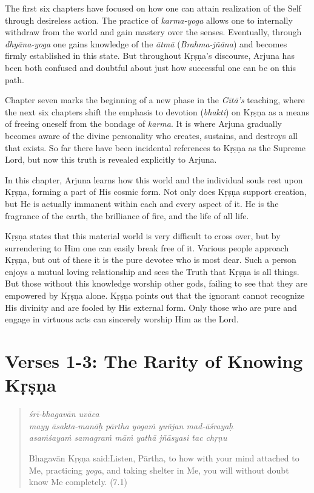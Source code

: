 \documentclass[12pt, twoside, openright]{memoir}
\begin{document}
\noindent The first six chapters have focused on how one can attain realization of the Self through desireless action. The practice of \textit{karma-yoga} allows one to internally withdraw from the world and gain mastery over the senses. Eventually, through \textit{dhyāna-yoga} one gains knowledge of the \textit{ātmā} (\textit{Brahma-jñāna}) and becomes firmly established in this state. But throughout Kṛṣṇa's discourse, Arjuna has been both confused and doubtful about just how successful one can be on this path.

Chapter seven marks the beginning of a new phase in the \textit{Gītā’s} teaching, where the next six chapters shift the emphasis to devotion (\textit{bhakti}) on Kṛṣṇa as a means of freeing oneself from the bondage of \textit{karma}. It is where Arjuna gradually becomes aware of the divine personality who creates, sustains, and destroys all that exists. So far there have been incidental references to Kṛṣṇa as the Supreme Lord, but now this truth is revealed explicitly to Arjuna.

In this chapter, Arjuna learns how this world and the individual souls rest upon Kṛṣṇa, forming a part of His cosmic form. Not only does Kṛṣṇa support creation, but He is actually immanent within each and every aspect of it. He is the fragrance of the earth, the brilliance of fire, and the life of all life.

Kṛṣṇa states that this material world is very difficult to cross over, but by surrendering to Him one can easily break free of it. Various people approach Kṛṣṇa, but out of these it is the pure devotee who is most dear. Such a person enjoys a mutual loving relationship and sees the Truth that Kṛṣṇa is all things. But those without this knowledge worship other gods, failing to see that they are empowered by Kṛṣṇa alone. Kṛṣṇa points out that the ignorant cannot recognize His divinity and are fooled by His external form. Only those who are pure and engage in virtuous acts can sincerely worship Him as the Lord.

\section{Verses 1-3: The Rarity of Knowing Kṛṣṇa}\label{sec-verses-1-3-the-rarity-of-knowing-krsna}


\par
\begin{verse}
\textit{śrī-bhagavān uvāca} \\
\textit{mayy āsakta-manāḥ pārtha yogaṁ yuñjan mad-āśrayaḥ} \\
\textit{asaṁśayaṁ samagraṁ māṁ yathā jñāsyasi tac chṛṇu}

\noindent \quad Bhagavān Kṛṣṇa said:\linebreak Listen, Pārtha, to how with your mind attached to Me, practicing \textit{yoga}, and taking shelter in Me, you will without doubt know Me completely. (7.1)
\end{verse}
\par
\end{document}
